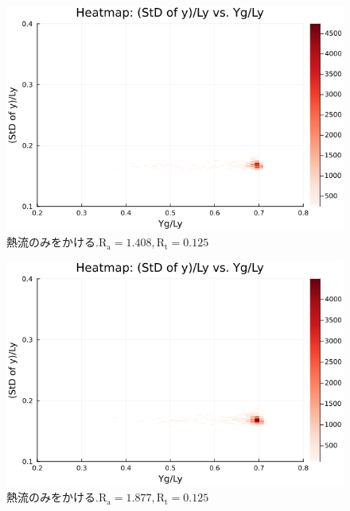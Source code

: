 \begin{figure}[H]
  \centering
  \includegraphics[scale=0.6]{image/g0_heat/2024-01-15T14:07:35.058_mapg0_chiinf_Ay50_rho0.4_T0.43_dT0.04_Rd0.0_Rt0.125_Ra1.4081535_g0_run4.0e7.png}
  \caption{$熱流のみをかける. \text{R}_\text{a}=1.408,\text{R}_\text{t}=0.125$}
  \label{}
\end{figure}

\begin{figure}[H]
  \centering
  \includegraphics[scale=0.6]{image/g0_heat/2024-01-15T14:07:35.126_mapg0_chiinf_Ay50_rho0.4_T0.43_dT0.04_Rd0.0_Rt0.125_Ra1.877538_g0_run4.0e7.png}
  \caption{$熱流のみをかける. \text{R}_\text{a}=1.877,\text{R}_\text{t}=0.125$}
  \label{}
\end{figure}

